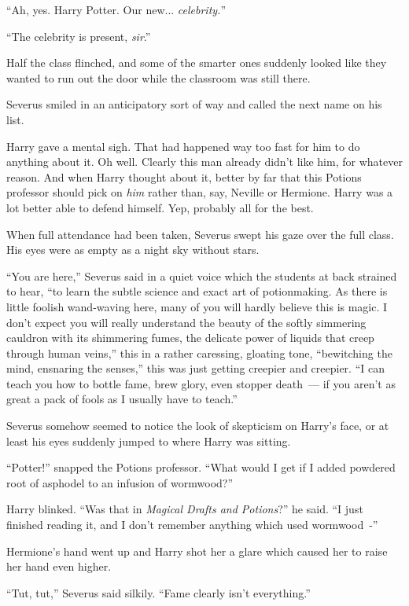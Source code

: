 ``Ah, yes. Harry Potter. Our new... \emph{celebrity.}''

``The celebrity is present, \emph{sir}.''

Half the class flinched, and some of the smarter ones suddenly looked like they wanted to run out the door while the classroom was still there.

Severus smiled in an anticipatory sort of way and called the next name on his list.

Harry gave a mental sigh. That had happened way too fast for him to do anything about it. Oh well. Clearly this man already didn't like him, for whatever reason. And when Harry thought about it, better by far that this Potions professor should pick on \emph{him} rather than, say, Neville or Hermione. Harry was a lot better able to defend himself. Yep, probably all for the best.

When full attendance had been taken, Severus swept his gaze over the full class. His eyes were as empty as a night sky without stars.

``You are here,'' Severus said in a quiet voice which the students at back strained to hear, ``to learn the subtle science and exact art of potionmaking. As there is little foolish wand-waving here, many of you will hardly believe this is magic. I don't expect you will really understand the beauty of the softly simmering cauldron with its shimmering fumes, the delicate power of liquids that creep through human veins,'' this in a rather caressing, gloating tone, ``bewitching the mind, ensnaring the senses,'' this was just getting creepier and creepier. ``I can teach you how to bottle fame, brew glory, even stopper death~--- if you aren't as great a pack of fools as I usually have to teach.''

Severus somehow seemed to notice the look of skepticism on Harry's face, or at least his eyes suddenly jumped to where Harry was sitting.

``Potter!'' snapped the Potions professor. ``What would I get if I added powdered root of asphodel to an infusion of wormwood?''

Harry blinked. ``Was that in \emph{Magical Drafts and Potions}?'' he said. ``I just finished reading it, and I don't remember anything which used wormwood~-''

Hermione's hand went up and Harry shot her a glare which caused her to raise her hand even higher.

``Tut, tut,'' Severus said silkily. ``Fame clearly isn't everything.''

